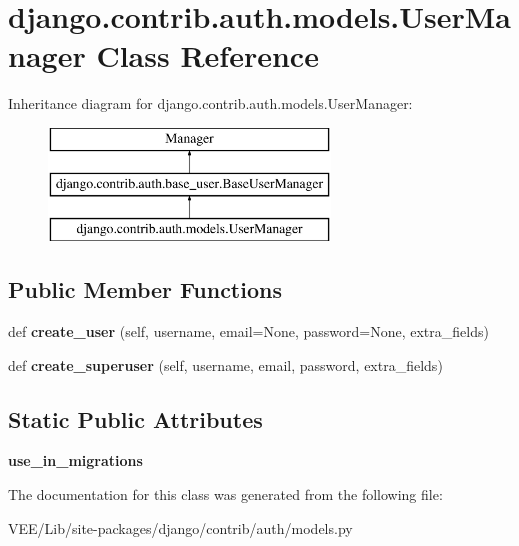 \hypertarget{classdjango_1_1contrib_1_1auth_1_1models_1_1_user_manager}{}\section{django.\+contrib.\+auth.\+models.\+User\+Manager Class Reference}
\label{classdjango_1_1contrib_1_1auth_1_1models_1_1_user_manager}
Inheritance diagram for django.\+contrib.\+auth.\+models.\+User\+Manager\+:\begin{figure}[H]
\begin{center}
\leavevmode
\includegraphics[height=3.000000cm]{classdjango_1_1contrib_1_1auth_1_1models_1_1_user_manager}
\end{center}
\end{figure}
\subsection*{Public Member Functions}
\begin{DoxyCompactItemize}
\item 
\mbox{\label{classdjango_1_1contrib_1_1auth_1_1models_1_1_user_manager_af8eafbe7a55b316b0e92415629c89815}} 
def {\bfseries create\+\_\+user} (self, username, email=None, password=None, extra\+\_\+fields)
\item 
\mbox{\label{classdjango_1_1contrib_1_1auth_1_1models_1_1_user_manager_a828cb3afc7f09720f347293fbaac6002}} 
def {\bfseries create\+\_\+superuser} (self, username, email, password, extra\+\_\+fields)
\end{DoxyCompactItemize}
\subsection*{Static Public Attributes}
\begin{DoxyCompactItemize}
\item 
\mbox{\label{classdjango_1_1contrib_1_1auth_1_1models_1_1_user_manager_a66a060e1c4cec676952e54f7045a3b8e}} 
{\bfseries use\+\_\+in\+\_\+migrations}
\end{DoxyCompactItemize}


The documentation for this class was generated from the following file\+:\begin{DoxyCompactItemize}
\item 
V\+E\+E/\+Lib/site-\/packages/django/contrib/auth/models.\+py\end{DoxyCompactItemize}
